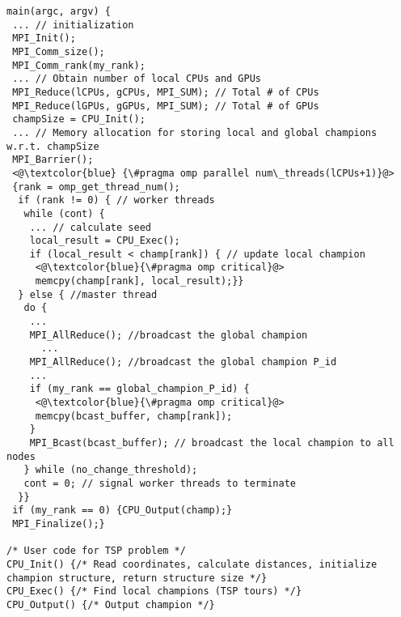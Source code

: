 \begin{frame}{}
  \lstset{language=C}
 \begin{lstlisting}[caption={ILCS overview},label={lst:ilcs}]
main(argc, argv) {
 ... // initialization
 MPI_Init();
 MPI_Comm_size();
 MPI_Comm_rank(my_rank);
 ... // Obtain number of local CPUs and GPUs
 MPI_Reduce(lCPUs, gCPUs, MPI_SUM); // Total # of CPUs
 MPI_Reduce(lGPUs, gGPUs, MPI_SUM); // Total # of GPUs
 champSize = CPU_Init();
 ... // Memory allocation for storing local and global champions w.r.t. champSize
 MPI_Barrier();
 <@\textcolor{blue} {\#pragma omp parallel num\_threads(lCPUs+1)}@>
 {rank = omp_get_thread_num();
  if (rank != 0) { // worker threads
   while (cont) {
    ... // calculate seed
    local_result = CPU_Exec();
    if (local_result < champ[rank]) { // update local champion
     <@\textcolor{blue}{\#pragma omp critical}@>
     memcpy(champ[rank], local_result);}}
  } else { //master thread
   do {
    ...
    MPI_AllReduce(); //broadcast the global champion
	  ...
    MPI_AllReduce(); //broadcast the global champion P_id
    ...
    if (my_rank == global_champion_P_id) {
     <@\textcolor{blue}{\#pragma omp critical}@>
     memcpy(bcast_buffer, champ[rank]);
    }
    MPI_Bcast(bcast_buffer); // broadcast the local champion to all nodes
   } while (no_change_threshold);
   cont = 0; // signal worker threads to terminate
  }}
 if (my_rank == 0) {CPU_Output(champ);}
 MPI_Finalize();}

/* User code for TSP problem */
CPU_Init() {/* Read coordinates, calculate distances, initialize champion structure, return structure size */}
CPU_Exec() {/* Find local champions (TSP tours) */}
CPU_Output() {/* Output champion */}
\end{lstlisting}
\end{frame}
